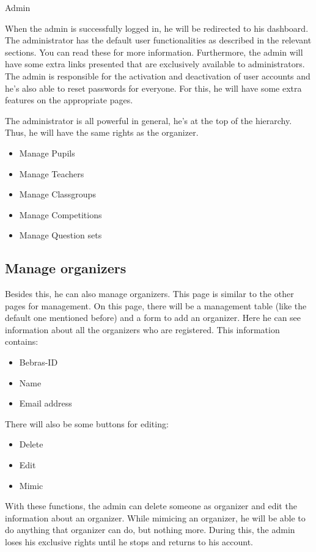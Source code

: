 \begin{section}{Admin}

When the admin is successfully logged in, he will be redirected to his dashboard. The administrator has the default user functionalities as described in the relevant sections. You can read these for more information. Furthermore, the admin will have some extra links presented that are exclusively available to administrators. \\
The admin is responsible for the activation and deactivation of user accounts and he's also able to reset passwords for everyone. For this, he will have some extra features on the appropriate pages.

The administrator is all powerful in general, he's at the top of the hierarchy. Thus, he will have the same rights as the organizer.
\begin{itemize}
\item Manage Pupils
\item Manage Teachers
\item Manage Classgroups
\item Manage Competitions
\item Manage Question sets
\end{itemize}

\subsection{Manage organizers}
Besides this, he can also manage organizers. This page is similar to the other pages for management. On this page, there will be a management table (like the default one mentioned before) and a form to add an organizer. Here he can see information about all the organizers who are registered. This information contains:
\begin{itemize}
\item Bebras-ID
\item Name
\item Email address
\end{itemize}

There will also be some buttons for editing:
\begin{itemize}
\item Delete
\item Edit
\item Mimic
\end{itemize}

With these functions, the admin can delete someone as organizer and edit the information about an organizer. While mimicing an organizer, he will be able to do anything that organizer can do, but nothing more. During this, the admin loses his exclusive rights until he stops and returns to his account.


\end{section}
